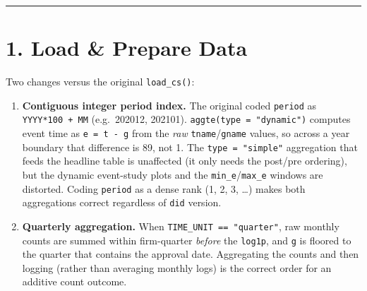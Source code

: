 \documentclass[
]{article}
\begin{document}
\begin{center}\rule{0.5\linewidth}{0.5pt}\end{center}

\section{1. Load \& Prepare Data}\label{load-prepare-data}

Two changes versus the original \texttt{load\_cs()}:

\begin{enumerate}
\def\labelenumi{\arabic{enumi}.}
\item
  \textbf{Contiguous integer period index.} The original coded
  \texttt{period} as \texttt{YYYY*100\ +\ MM} (e.g.~202012, 202101).
  \texttt{aggte(type\ =\ "dynamic")} computes event time as
  \texttt{e\ =\ t\ -\ g} from the \emph{raw}
  \texttt{tname}/\texttt{gname} values, so across a year boundary that
  difference is 89, not 1. The \texttt{type\ =\ "simple"} aggregation
  that feeds the headline table is unaffected (it only needs the
  post/pre ordering), but the dynamic event-study plots and the
  \texttt{min\_e}/\texttt{max\_e} windows are distorted. Coding
  \texttt{period} as a dense rank (1, 2, 3, \ldots) makes both
  aggregations correct regardless of \texttt{did} version.
\item
  \textbf{Quarterly aggregation.} When
  \texttt{TIME\_UNIT\ ==\ "quarter"}, raw monthly counts are summed
  within firm-quarter \emph{before} the \texttt{log1p}, and \texttt{g}
  is floored to the quarter that contains the approval date. Aggregating
  the counts and then logging (rather than averaging monthly logs) is
  the correct order for an additive count outcome.
\end{enumerate}
\end{document}

